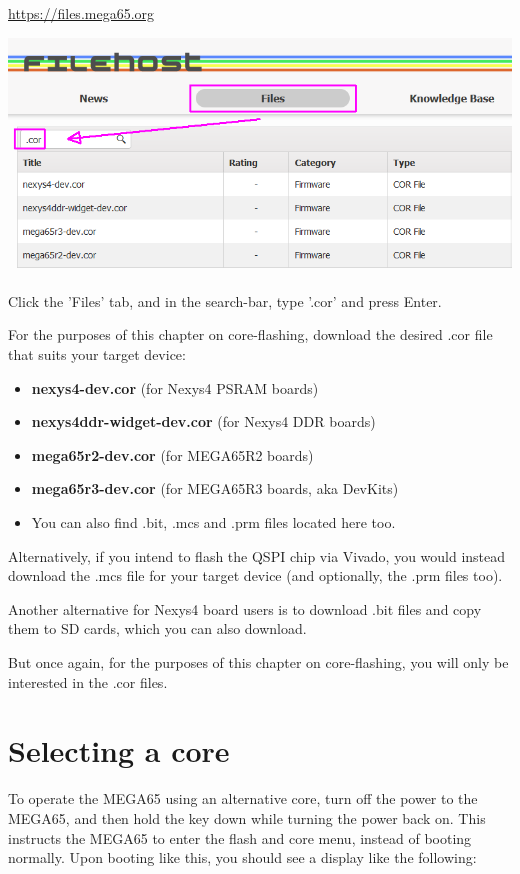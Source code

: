 \url{https://files.mega65.org}

\includegraphics[width=\linewidth]{images/latest_bitstream.png}

Click the 'Files' tab, and in the search-bar, type '.cor' and press Enter.

For the purposes of this chapter on core-flashing, download the desired .cor file that suits your target device:

\begin{itemize}
  \item{\textbf{nexys4-dev.cor} (for Nexys4 PSRAM boards)}
  \item{\textbf{nexys4ddr-widget-dev.cor} (for Nexys4 DDR boards)}
  \item{\textbf{mega65r2-dev.cor} (for MEGA65R2 boards)}
  \item{\textbf{mega65r3-dev.cor} (for MEGA65R3 boards, aka DevKits)}
  \item{You can also find .bit, .mcs and .prm files located here too.}
\end{itemize}

Alternatively, if you intend to flash the QSPI chip via Vivado, you would instead download the .mcs file for your target device (and optionally, the .prm files too).

Another alternative for Nexys4 board users is to download .bit files and copy them to SD cards, which you can also download.

But once again, for the purposes of this chapter on core-flashing, you will only be interested in the .cor files.

\section{Selecting a core}

To operate the MEGA65 using an alternative core, turn off the power to the MEGA65, and then hold the
 key down while turning the power back on.  This instructs the MEGA65 to enter the
flash and core menu, instead of booting normally. Upon booting like this, you should see a display like the following:

